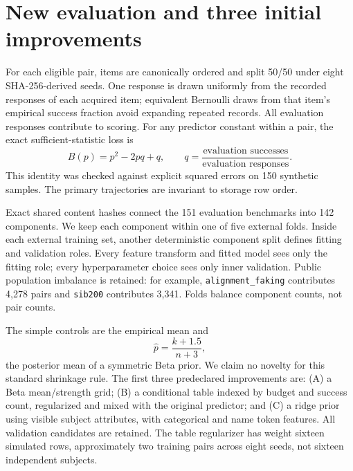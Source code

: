 \documentclass{article}
\begin{document}
\section{New evaluation and three initial improvements}
For each eligible pair, items are canonically ordered and split 50/50 under
eight SHA-256-derived seeds. One response is drawn uniformly from the recorded
responses of each acquired item; equivalent Bernoulli draws from that item's
empirical success fraction avoid expanding repeated records. All evaluation
responses contribute to scoring. For any predictor constant within a pair,
the exact sufficient-statistic loss is
\begin{equation}
 B(p)=p^2-2pq+q,\qquad q=\frac{\text{evaluation successes}}{\text{evaluation responses}}.
\end{equation}
This identity was checked against explicit squared errors on 150 synthetic
samples. The primary trajectories are invariant to storage row order.

Exact shared content hashes connect the 151 evaluation benchmarks into
142 components. We keep each component within one of five external folds.
Inside each external training set, another deterministic component split
defines fitting and validation roles. Every feature transform and fitted
model sees only the fitting role; every hyperparameter choice sees only
inner validation. Public population imbalance is retained: for example,
\texttt{alignment\_faking} contributes 4,278 pairs and \texttt{sib200}
contributes 3,341. Folds balance component counts, not pair counts.

The simple controls are the empirical mean and
\begin{equation}
 \widehat p=\frac{k+1.5}{n+3},
\end{equation}
the posterior mean of a symmetric Beta prior. We claim no novelty for this
standard shrinkage rule. The first three predeclared improvements are:
(A) a Beta mean/strength grid; (B) a conditional table indexed by budget and
success count, regularized and mixed with the original predictor; and
(C) a ridge prior using visible subject attributes, with categorical and name
token features. All validation candidates are retained. The table regularizer
has weight sixteen simulated rows, approximately two training pairs across
eight seeds, not sixteen independent subjects.
\end{document}
